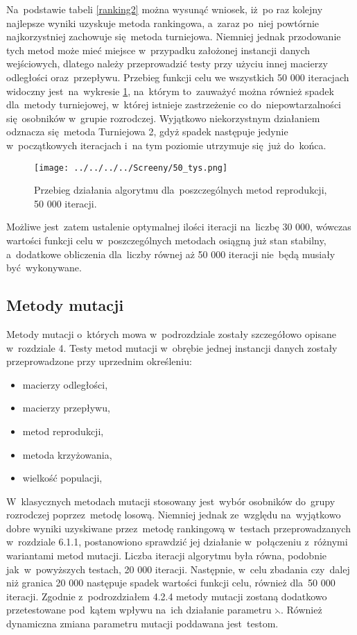 Na~podstawie tabeli \ref{ranking2} można wysunąć wniosek, iż~po raz kolejny najlepsze wyniki uzyskuje metoda rankingowa, a~zaraz po~niej powtórnie najkorzystniej zachowuje się~metoda turniejowa. Niemniej jednak przodowanie tych metod może mieć miejsce w~przypadku założonej instancji danych wejściowych, dlatego należy przeprowadzić testy przy użyciu innej macierzy odległości oraz~przepływu. Przebieg funkcji celu we wszystkich 50 000 iteracjach widoczny jest~na~wykresie \ref{ranking2picun}, na~którym to~zauważyć można również spadek dla~metody turniejowej, w~której istnieje zastrzeżenie co do~niepowtarzalności się~osobników w~grupie rozrodczej. Wyjątkowo niekorzystnym działaniem odznacza się~metoda Turniejowa 2, gdyż spadek następuje jedynie w~początkowych iteracjach i~na tym poziomie utrzymuje się~już do~końca.

\begin{figure}[h!]
		\texttt{[image: ../../../../Screeny/50\_tys.png]}
		\caption{Przebieg działania algorytmu dla~poszczególnych metod reprodukcji, 50 000 iteracji.}
		\label{ranking2picun}			
\end{figure}

Możliwe jest~zatem ustalenie optymalnej ilości iteracji na~liczbę 30 000, wówczas wartości funkcji celu w~poszczególnych metodach osiągną już stan stabilny, a~dodatkowe obliczenia dla~liczby równej aż 50 000 iteracji nie~będą musiały być~wykonywane.

\subsection{Metody mutacji}\label{mutacja}

Metody mutacji o~których mowa w~podrozdziale zostały szczegółowo opisane w~rozdziale 4. Testy metod mutacji w~obrębie jednej instancji danych zostały przeprowadzone przy uprzednim określeniu:
\begin{itemize}
\item
macierzy odległości,
\item
macierzy przepływu,
\item
metod reprodukcji,
\item
metoda krzyżowania,
\item
wielkość populacji,
\end{itemize}
\par
W~klasycznych metodach mutacji stosowany jest~wybór osobników do~grupy rozrodczej poprzez~metodę losową. Niemniej jednak ze~względu na~wyjątkowo dobre wyniki uzyskiwane przez~metodę rankingową w~testach przeprowadzanych w~rozdziale 6.1.1, postanowiono sprawdzić jej działanie w~połączeniu z~różnymi wariantami metod mutacji. Liczba iteracji algorytmu była równa, podobnie jak~w~powyższych testach, 20 000 iteracji. Następnie, w~celu zbadania czy~dalej niż granica 20 000 następuje spadek wartości funkcji celu, również dla~50 000 iteracji. Zgodnie z~podrozdziałem 4.2.4 metody mutacji zostaną dodatkowo przetestowane pod~kątem wpływu na~ich działanie parametru $\leftthreetimes$. Również dynamiczna zmiana parametru mutacji poddawana jest~testom.

